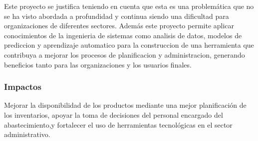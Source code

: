 Este proyecto se justifica teniendo en cuenta que esta es una problemática que no se ha visto abordada a profundidad y continua siendo una dificultad para organizaciones de diferentes sectores. Además este proyecto permite aplicar conocimientos de la ingenieria de sistemas como analisis de datos, modelos de prediccion y aprendizaje automatico para la construccion de una herramienta que contribuya a mejorar los procesos de planificacion y administracion, generando beneficios tanto para las organizaciones y los usuarios finales.

\subsubsection{Impactos}

Mejorar la disponibilidad de los productos mediante una mejor planificación de los inventarios, apoyar la toma de decisiones del personal encargado del abastecimiento,y fortalecer el uso de herramientas tecnológicas en el sector administrativo.
